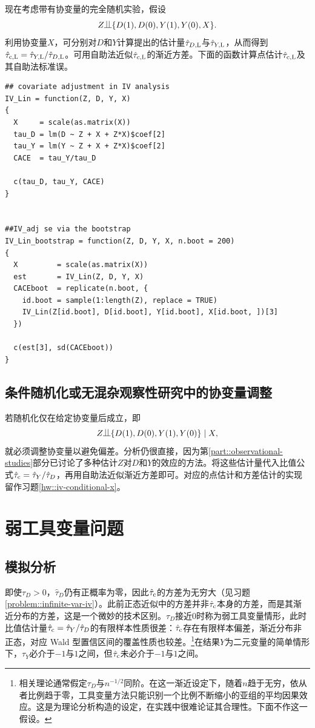 现在考虑带有协变量的完全随机实验，假设
$$
Z\ind \{ D(1), D(0), Y(1), Y(0), X \}.
$$
利用协变量$X$，可分别对$D$和$Y$计算\citet{lin2013}提出的估计量$\hat{\tau}_{D,\textsc{L}}$与$\hat{\tau}_{Y,\textsc{L}}$，从而得到$\hat{\tau}_{\textup{c}, \textsc{L}} = \hat{\tau}_{Y,\textsc{L}} / \hat{\tau}_{D,\textsc{L}}$。可用自助法近似$\hat{\tau}_{\textup{c}, \textsc{L}} $的渐近方差。下面的函数计算点估计$\hat{\tau}_{\textup{c}, \textsc{L}} $及其自助法标准误。 
 
\begin{lstlisting}
## covariate adjustment in IV analysis
IV_Lin = function(Z, D, Y, X)
{
  X     = scale(as.matrix(X))
  tau_D = lm(D ~ Z + X + Z*X)$coef[2]
  tau_Y = lm(Y ~ Z + X + Z*X)$coef[2]
  CACE  = tau_Y/tau_D
  
  c(tau_D, tau_Y, CACE)
}


##IV_adj se via the bootstrap
IV_Lin_bootstrap = function(Z, D, Y, X, n.boot = 200)
{
  X         = scale(as.matrix(X))
  est       = IV_Lin(Z, D, Y, X)
  CACEboot  = replicate(n.boot, {
    id.boot = sample(1:length(Z), replace = TRUE)
    IV_Lin(Z[id.boot], D[id.boot], Y[id.boot], X[id.boot, ])[3]
  })
  
  c(est[3], sd(CACEboot))
}
\end{lstlisting}

\subsection{条件随机化或无混杂观察性研究中的协变量调整}
\label{section::unconfounded-IV}

若随机化仅在给定协变量后成立，即
$$
Z\ind \{ D(1), D(0), Y(1), Y(0) \} \mid  X,
$$
就必须调整协变量以避免偏差。分析仍很直接，因为第\ref{part::observational-studies}部分已讨论了多种估计$ Z$对$D$和$Y$的效应的方法。将这些估计量代入比值公式$\hat{\tau}_{\textup{c}} = \hat{\tau}_Y / \hat{\tau}_D$，再用自助法近似渐近方差即可。对应的点估计和方差估计的实现留作习题\ref{hw::iv-conditional-x}。 



\section{弱工具变量问题}

\subsection{模拟分析}
 
即使$\tau_D >0$，$\hat{\tau}_D$仍有正概率为零，因此$\hat{\tau}_{\textup{c}}$的方差为无穷大（见习题\ref{problem::infinite-var-iv}）。此前正态近似中的方差并非$\hat{\tau}_{\textup{c}}$本身的方差，而是其渐近分布的方差，这是一个微妙的技术区别。$ \tau_D$接近$0$时称为弱工具变量情形，此时比值估计量$\hat{\tau}_{\textup{c}} = \hat{\tau}_Y / \hat{\tau}_D$的有限样本性质很差：$\hat{\tau}_{\textup{c}}$存在有限样本偏差，渐近分布非正态，对应 Wald 型置信区间的覆盖性质也较差。\footnote{相关理论通常假定$\tau_D$与$n^{-1/2}$同阶。在这一渐近设定下，随着$n$趋于无穷，依从者比例趋于零，工具变量方法只能识别一个比例不断缩小的亚组的平均因果效应。这是为理论分析构造的设定，在实践中很难论证其合理性。下面不作这一假设。}在结果$Y$为二元变量的简单情形下，$\tau_Y$必介于$-1$与$1$之间，但$\hat{\tau}_{\textup{c}}$未必介于$-1$与$1$之间。 
 

